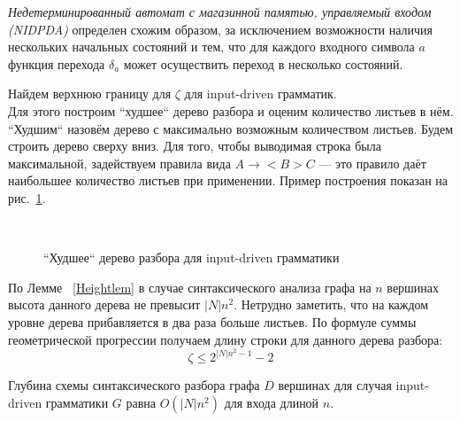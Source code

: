 \documentclass{spbau-diploma}
\begin{document}
\textit{Недетерминированный автомат с магазинной памятью, управляемый входом (NIDPDA)} определен схожим образом, за исключением возможности наличия нескольких начальных состояний и тем, что для каждого входного символа $a$ функция перехода $\delta_a$ может осуществить переход в несколько состояний. \par
Найдем верхнюю границу для $\zeta$ для input-driven грамматик. 
\\Для этого построим ``худшее`` дерево разбора и оценим количество листьев в нём. ``Худшим`` назовём дерево с максимально возможным количеством листьев. Будем строить дерево сверху вниз. Для того, чтобы выводимая строка была максимальной, задействуем правила вида $A \rightarrow <B>C$ --- это правило даёт наибольшее количество листьев при применении. Пример построения показан на рис.~\ref{IDw}. 
\\
\begin{figure}
\centering

 \\
	\caption{``Худшее`` дерево разбора для input-driven грамматики}
\label{IDw}
\end{figure}
По Лемме ~\ref{Heightlem} в случае синтаксического анализа графа на $n$ вершинах высота данного дерева не превысит $|N|n^2$. Нетрудно заметить, что на каждом уровне дерева прибавляется в два раза больше листьев. По формуле суммы геометрической прогрессии получаем длину строки для данного дерева разбора: 
\begin{equation}
\zeta \le  2^{|N|n^2 - 1} - 2
\end{equation}
\begin{corollaryrus} 
Глубина схемы синтаксического разбора графа $D$  вершинах для случая input-driven грамматики $G$ равна $O(|N|n^2)$ для входа длиной $n$.
\end{corollaryrus}
\end{document}
